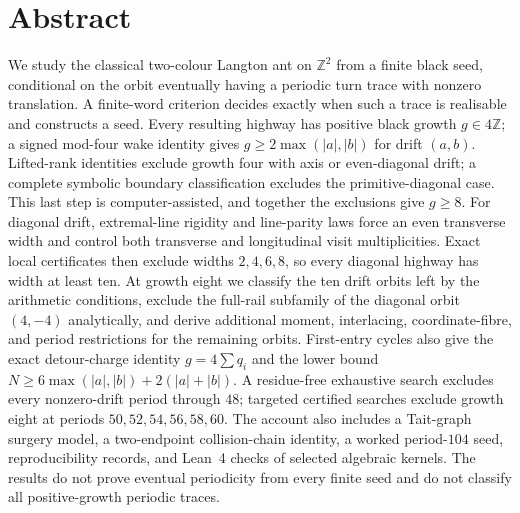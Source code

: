 \documentclass[11pt,letterpaper]{article}
\theoremstyle{plain}
\theoremstyle{definition}
\newcommand{\Z}{\mathbb{Z}}
\newcommand{\growth}{g}
\begin{document}
\section*{Abstract}
We study the classical two-colour Langton ant on $\Z^2$ from a finite black seed,
conditional on the orbit eventually having a periodic turn trace with nonzero
translation.  A finite-word criterion decides exactly when such a trace is
realisable and constructs a seed.  Every resulting highway has positive black
growth $\growth\in4\Z$; a signed mod-four wake identity gives
$\growth\ge2\max(|a|,|b|)$ for drift $(a,b)$.  Lifted-rank identities exclude
growth four with axis or even-diagonal drift; a complete symbolic boundary classification excludes the primitive-diagonal case.
This last step is computer-assisted, and together the exclusions give $\growth\ge8$.  For diagonal drift,
extremal-line rigidity and line-parity laws force an even transverse width and
control both transverse and longitudinal visit multiplicities.  Exact local
certificates then exclude widths $2,4,6,8$, so every diagonal highway has width at
least ten.  At growth eight we classify the ten drift orbits left by the arithmetic
conditions, exclude the full-rail subfamily of the diagonal orbit $(4,-4)$ analytically, and derive
additional moment, interlacing, coordinate-fibre, and period restrictions for the
remaining orbits. First-entry cycles also give the exact detour-charge
identity $\growth=4\sum q_i$ and the lower bound
$N\ge6\max(|a|,|b|)+2(|a|+|b|)$. A residue-free exhaustive search excludes every nonzero-drift
period through $48$; targeted certified searches exclude growth eight at periods
$50,52,54,56,58,60$.  The account also includes a Tait-graph surgery model, a
two-endpoint collision-chain identity, a worked period-$104$ seed, reproducibility
records, and Lean~4 checks of selected algebraic kernels.  The results do not prove
eventual periodicity from every finite seed and do not classify all positive-growth
periodic traces.
\clearpage\setcounter{page}{1}
\end{document}
